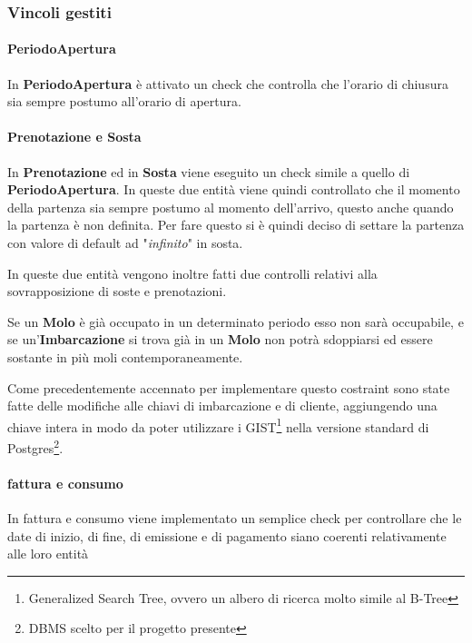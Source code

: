 \subsubsection{Vincoli gestiti}

\paragraph{PeriodoApertura}
In \textbf{PeriodoApertura} è attivato un check che controlla che l'orario di chiusura sia sempre postumo all'orario di apertura.

\paragraph{Prenotazione e Sosta}
In \textbf{Prenotazione} ed in \textbf{Sosta} viene eseguito un check simile a quello di \textbf{PeriodoApertura}. In queste due entità viene quindi controllato che il momento della partenza sia sempre postumo al momento dell'arrivo, questo anche quando la partenza è non definita. Per fare questo si è quindi deciso di settare la partenza con valore di default ad "\textit{infinito}" in sosta.

In queste due entità vengono inoltre fatti due controlli relativi alla sovrapposizione di soste e prenotazioni.

Se un \textbf{Molo} è già occupato in un determinato periodo esso non sarà occupabile, e se un'\textbf{Imbarcazione} si trova già in un \textbf{Molo} non potrà sdoppiarsi ed essere sostante in più moli contemporaneamente.

Come precedentemente accennato per implementare questo costraint sono state fatte delle modifiche alle chiavi di imbarcazione e di cliente, aggiungendo una chiave intera in modo da poter utilizzare i GIST\footnote{Generalized Search Tree, ovvero un albero di ricerca molto simile al B-Tree} nella versione standard di Postgres\footnote{DBMS scelto per il progetto presente}.

\paragraph{fattura e consumo}

In fattura e consumo viene implementato un semplice check per controllare che le date di inizio, di fine, di emissione e di pagamento siano coerenti relativamente alle loro entità
